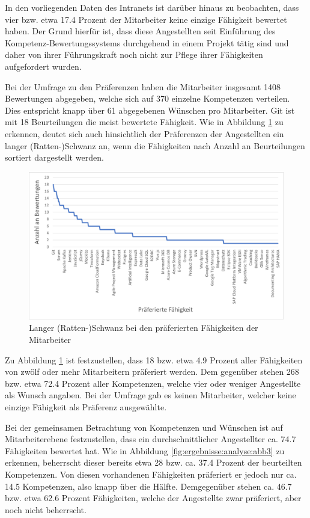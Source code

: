 In den vorliegenden Daten des Intranets ist darüber hinaus zu beobachten, dass vier bzw. etwa 17.4 Prozent der Mitarbeiter keine einzige Fähigkeit bewertet haben. Der Grund hierfür ist, dass diese Angestellten seit Einführung des Kompetenz-Bewertungssystems durchgehend in einem Projekt tätig sind und daher von ihrer Führungskraft noch nicht zur Pflege ihrer Fähigkeiten aufgefordert wurden.

Bei der Umfrage zu den Präferenzen haben die Mitarbeiter insgesamt 1408 Bewertungen abgegeben, welche sich auf 370 einzelne Kompetenzen verteilen. Dies entspricht knapp über 61 abgegebenen Wünschen pro Mitarbeiter. Git ist mit 18 Beurteilungen die meist bewertete Fähigkeit. Wie in Abbildung \ref{fig:ergebnisse:analyse:abb2} zu erkennen, deutet sich auch hinsichtlich der Präferenzen der Angestellten ein langer (Ratten-)Schwanz an, wenn die Fähigkeiten nach Anzahl an Beurteilungen sortiert dargestellt werden.
 
\begin{figure}[h]
	\centering
	\includegraphics[width=1\textwidth]{gfx/long-tail-praeferenzen.png}
	\caption{Langer (Ratten-)Schwanz bei den präferierten Fähigkeiten der Mitarbeiter}
	\label{fig:ergebnisse:analyse:abb2}
\end{figure}

Zu Abbildung \ref{fig:ergebnisse:analyse:abb2} ist festzustellen, dass 18 bzw. etwa 4.9 Prozent aller Fähigkeiten von zwölf oder mehr Mitarbeitern präferiert werden. Dem gegenüber stehen 268 bzw. etwa 72.4 Prozent aller Kompetenzen, welche vier oder weniger Angestellte als Wunsch angaben. Bei der Umfrage gab es keinen Mitarbeiter, welcher keine einzige Fähigkeit als Präferenz ausgewählte.

Bei der gemeinsamen Betrachtung von Kompetenzen und Wünschen ist auf Mitarbeiterebene festzustellen, dass ein durchschnittlicher Angestellter ca. 74.7 Fähigkeiten bewertet hat. Wie in Abbildung \ref{fig:ergebnisse:analyse:abb3} zu erkennen, beherrscht dieser bereits etwa 28 bzw. ca. 37.4 Prozent der beurteilten Kompetenzen. Von diesen vorhandenen Fähigkeiten präferiert er jedoch nur ca. 14.5 Kompetenzen, also knapp über die Hälfte. Demgegenüber stehen ca. 46.7 bzw. etwa 62.6 Prozent Fähigkeiten, welche der Angestellte zwar präferiert, aber noch nicht beherrscht.

